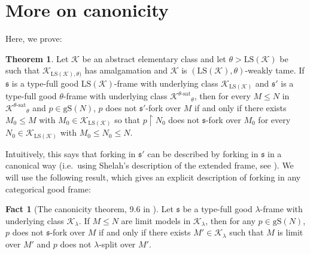 \documentclass[12pt]{amsart}
\theoremstyle{definition}
\newtheorem{thm}[mydef]{Theorem}
\newtheorem{fact}[mydef]{Fact}
\begin{document}
\appendix

\section{More on canonicity}

Here, we prove: 

\begin{thm}\label{frame-canon-weak-tameness}
  Let ${\mathcal{K}}$ be an abstract elementary class and let $\theta > {\text{LS}} ({\mathcal{K}})$ be such that ${\mathcal{K}}_{{\text{LS}} ({\mathcal{K}}), \theta)}$ has amalgamation and ${\mathcal{K}}$ is $({\text{LS}} ({\mathcal{K}}), \theta)$-weakly tame. If ${\mathfrak{s}}$ is a type-full good ${\text{LS}} ({\mathcal{K}})$-frame with underlying class ${\mathcal{K}}_{{\text{LS}} ({\mathcal{K}})}$ and ${\mathfrak{s}}'$ is a type-full good $\theta$-frame with underlying class ${{{{\mathcal{K}}}^{{{\theta}}\text{-sat}}}}_\theta$, then for every $M {\le} N$ in ${{{{\mathcal{K}}}^{{{\theta}}\text{-sat}}}}_\theta$ and $p \in {\text{gS}} (N)$, $p$ does not ${\mathfrak{s}}'$-fork over $M$ if and only if there exists $M_0 {\le} M$ with $M_0 \in {\mathcal{K}}_{{\text{LS}} ({\mathcal{K}})}$ so that $p {\upharpoonright} N_0$ does not ${\mathfrak{s}}$-fork over $M_0$ for every $N_0 \in {\mathcal{K}}_{{\text{LS}} ({\mathcal{K}})}$ with $M_0 {\le} N_0 {\le} N$.
\end{thm}

Intuitively, this says that forking in ${\mathfrak{s}}'$ can be described by forking in ${\mathfrak{s}}$ in a canonical way (i.e.\ using Shelah's description of the extended frame, see \cite[Section II.2]{shelahaecbook}). We will use the following result, which gives an explicit description of forking in any categorical good frame:

\begin{fact}[The canonicity theorem, 9.6 in \cite{indep-aec-v5}]\label{canon-fact}
  Let ${\mathfrak{s}}$ be a type-full good $\lambda$-frame with underlying class ${\mathcal{K}}_\lambda$.
  If $M {\le} N$ are limit models in ${\mathcal{K}}_{\lambda}$, then for any $p \in {\text{gS}} (N)$, $p$ does not ${\mathfrak{s}}$-fork over $M$ if and only if there exists $M' \in {\mathcal{K}}_{\lambda}$ such that $M$ is limit over $M'$ and $p$ does not $\lambda$-split over $M'$.
\end{fact}
\end{document}
